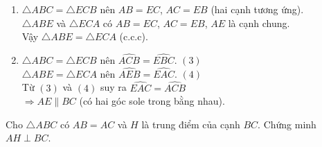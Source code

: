 \begin{bt}
{\begin{enumerate}
			$\triangle ABC = \triangle FCB$ nên $\widehat{ACB} = \widehat{FBC}$ (hai góc tương ứng).\\
			$\Rightarrow AC \parallel BF$ (có hai góc sole trong bằng nhau).
			\item $\triangle ABC = \triangle ECB$ nên $AB = EC$, $AC = EB$ (hai cạnh tương ứng).\\
			$\triangle ABE$ và $\triangle ECA$ có $AB = EC$, $AC = EB$, $AE$ là cạnh chung.\\
			Vậy $\triangle ABE = \triangle ECA$ (c.c.c).
			\item $\triangle ABC = \triangle ECB$ nên $\widehat{ACB} = \widehat{EBC}$. \hfill $(3)$\\
			$\triangle ABE = \triangle ECA$ nên $\widehat{AEB} = \widehat{EAC}$. \hfill $(4)$\\
			Từ $(3)$ và $(4)$ suy ra $\widehat{EAC} = \widehat{ACB}$\\
			$\Rightarrow AE \parallel BC$ (có hai góc sole trong bằng nhau).
		\end{enumerate}
	}
\end{bt}

\begin{bt}%
	Cho $\triangle ABC$ có $AB = AC$ và $H$ là trung điểm của cạnh $BC$. Chứng minh $AH \perp BC$.
\end{bt}

